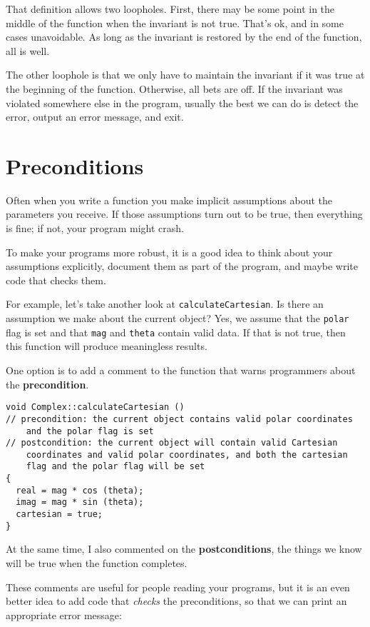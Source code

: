 That definition allows two loopholes.  First, there may be some
point in the middle of the function when the invariant is not
true.  That's ok, and in some cases unavoidable.  As long as the
invariant is restored by the end of the function, all is well.

The other loophole is that we only have to maintain the invariant
if it was true at the beginning of the function.  Otherwise, all
bets are off.  If the invariant was violated somewhere else in
the program, usually the best we can do is detect the error,
output an error message, and exit.

\section{Preconditions}

Often when you write a function you make implicit assumptions
about the parameters you receive.  If those assumptions turn
out to be true, then everything is fine; if not, your program
might crash.

To make your programs more robust, it is a good idea to think
about your assumptions explicitly, document them as part of the
program, and maybe write code that checks them.

For example, let's take another look at {\tt calculateCartesian}.
Is there an assumption we make about the current object?  Yes,
we assume that the {\tt polar} flag is set and that {\tt mag}
and {\tt theta} contain valid data.  If that is not true, then
this function will produce meaningless results.

One option is to add a comment to the function that warns
programmers about the {\bf precondition}.

\begin{verbatim}
void Complex::calculateCartesian ()
// precondition: the current object contains valid polar coordinates
	and the polar flag is set
// postcondition: the current object will contain valid Cartesian
	coordinates and valid polar coordinates, and both the cartesian
	flag and the polar flag will be set
{
  real = mag * cos (theta);
  imag = mag * sin (theta);
  cartesian = true;
}
\end{verbatim}
%
At the same time, I also commented on the {\bf postconditions},
the things we know will be true when the function completes.

These comments are useful for people reading your programs, but
it is an even better idea to add code that {\em checks} the
preconditions, so that we can print an appropriate error message:

